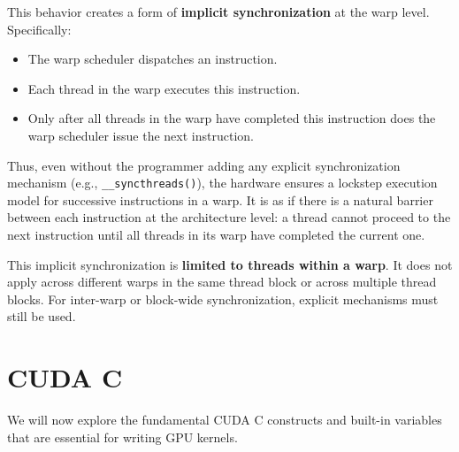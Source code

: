 \documentclass[12pt]{book}
\begin{document}
This behavior creates a form of \textbf{implicit synchronization} at the warp level. Specifically:
\begin{itemize}
    \item The warp scheduler dispatches an instruction.
    \item Each thread in the warp executes this instruction.
    \item Only after all threads in the warp have completed this instruction does the warp scheduler issue the next instruction.
\end{itemize}

Thus, even without the programmer adding any explicit synchronization mechanism (e.g., \texttt{\_\_syncthreads()}), the hardware ensures a lockstep execution model for successive instructions in a warp. It is as if there is a natural barrier between each instruction at the architecture level: a thread cannot proceed to the next instruction until all threads in its warp have completed the current one.

This implicit synchronization is \textbf{limited to threads within a warp}. It does not apply across different warps in the same thread block or across multiple thread blocks. For inter-warp or block-wide synchronization, explicit mechanisms must still be used.


\section{CUDA C}
We will now explore the fundamental CUDA C constructs and built-in variables that are essential for writing GPU kernels.
\end{document}
